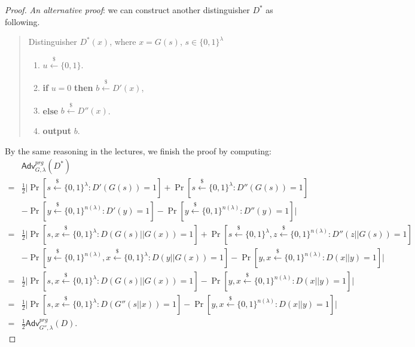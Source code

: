 \documentclass[12pt]{article}
\newcommand{\bits}{\{0,1\}}
\newcommand{\getsr}{\stackrel{\$}{\gets}}
\newcommand{\Adv}{\textsf{Adv}}
\theoremstyle{definition}
\begin{document}
\begin{proof}
\emph{An alternative proof}: we can construct another distinguisher $D^*$ as following.
\begin{quote}
Distinguisher $D^* (x)$, where $x=G(s)$, $s\in\bits^\lambda$
\begin{enumerate}
\item $u \getsr \bits$.
\item {\bf if} $u=0$ {\bf then} $b \getsr D'(x)$,
\item {\bf else} $b \getsr D''(x)$.
\item {\bf output} $b$.
\end{enumerate}
\end{quote}
By the same reasoning in the lectures, we finish the proof by computing:
$$\begin{aligned}
&\Adv_{G,\lambda}^{prg}(D^*) \\
=& \frac{1}{2} \bigg| \Pr[s \getsr \bits^\lambda: D'(G(s))=1] + \Pr[s \getsr \bits^\lambda: D''(G(s))=1] \\
& - \Pr[y \getsr \bits^{n(\lambda)}: D'(y)=1] - \Pr[y \getsr \bits^{n(\lambda)}: D''(y)=1] \bigg| \\
=& \frac{1}{2} \bigg| \Pr[s,x \getsr \bits^\lambda: D(G(s)||G(x))=1] + \Pr[s \getsr \bits^\lambda, z \getsr \bits^{n(\lambda)}: D''(z||G(s))=1] \\
& - \Pr[y \getsr \bits^{n(\lambda)}, x\getsr \bits^\lambda : D(y||G(x))=1] - \Pr[y,x \getsr \bits^{n(\lambda)}: D(x||y)=1] \bigg| \\
=& \frac{1}{2} \bigg| \Pr[s,x \getsr \bits^\lambda: D(G(s)||G(x))=1] - \Pr[y,x \getsr \bits^{n(\lambda)}: D(x||y)=1] \bigg| \\
=& \frac{1}{2} \bigg| \Pr[s,x \getsr \bits^\lambda: D(G''(s||x))=1] - \Pr[y,x \getsr \bits^{n(\lambda)}: D(x||y)=1] \bigg| \\
=& \frac{1}{2} \Adv_{G'',\lambda}^{prg}(D).
\end{aligned}$$
\end{proof}
\end{document}
